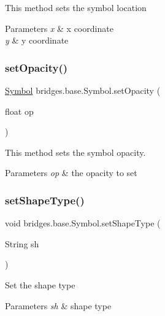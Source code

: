 This method sets the symbol location


\begin{DoxyParams}{Parameters}
{\em x} & x coordinate \\
\hline
{\em y} & y coordinate \\
\hline
\end{DoxyParams}
\mbox{\label{classbridges_1_1base_1_1_symbol_abac237b439448cbef3744817d14061c5}} 
\subsubsection{\texorpdfstring{set\+Opacity()}{setOpacity()}}
{\footnotesize\ttfamily \hyperlink{classbridges_1_1base_1_1_symbol}{Symbol} bridges.\+base.\+Symbol.\+set\+Opacity (\begin{DoxyParamCaption}\item[{float}]{op }\end{DoxyParamCaption})}



This method sets the symbol opacity. 


\begin{DoxyParams}{Parameters}
{\em op} & the opacity to set \\
\hline
\end{DoxyParams}
\mbox{\label{classbridges_1_1base_1_1_symbol_adf9559ecef8902f83cbb6bbefdf1c601}} 
\subsubsection{\texorpdfstring{set\+Shape\+Type()}{setShapeType()}}
{\footnotesize\ttfamily void bridges.\+base.\+Symbol.\+set\+Shape\+Type (\begin{DoxyParamCaption}\item[{String}]{sh }\end{DoxyParamCaption})\hspace{0.3cm}{\ttfamily [protected]}}

Set the shape type 
\begin{DoxyParams}{Parameters}
{\em sh} & shape type \\
\hline
\end{DoxyParams}
\mbox{\label{classbridges_1_1base_1_1_symbol_a387a5a5691e55e84a1d0367ca2066806}} 
